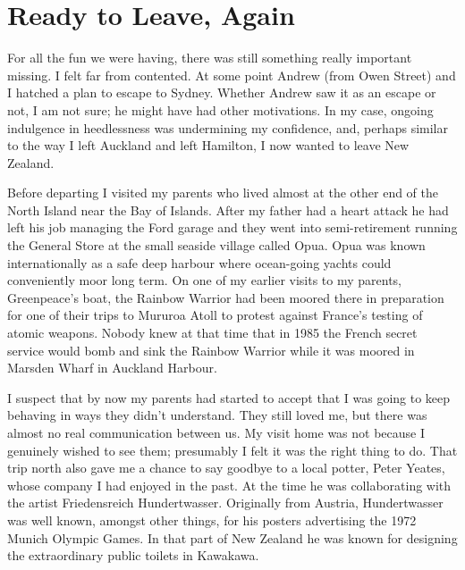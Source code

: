 \chapter{Ready to Leave, Again}

\enlargethispage{\baselineskip}

For all the fun we were having, there was still something really
important missing. I felt far from contented. At some point Andrew (from
Owen Street) and I hatched a plan to escape to Sydney. Whether Andrew
saw it as an escape or not, I am not sure; he might have had other
motivations. In my case, ongoing indulgence in heedlessness was
undermining my confidence, and, perhaps similar to the way I left
Auckland and left Hamilton, I now wanted to leave New Zealand.

Before departing I visited my parents who lived almost at the other end
of the North Island near the Bay of Islands. After my father had a heart
attack he had left his job managing the Ford garage and they went into
semi-retirement running the General Store at the small seaside village
called Opua. Opua was known internationally as a safe deep harbour where
ocean-going yachts could conveniently moor long term. On one of my
earlier visits to my parents, Greenpeace's boat, the \mbox{Rainbow} Warrior had been
moored there in preparation for one of their trips to Mururoa Atoll to
protest against France's testing of atomic weapons. Nobody knew at that
time that in 1985 the French secret service would bomb and sink the
Rainbow Warrior while it was moored in Marsden Wharf\cite{rainbow-warrior} in Auckland Harbour.

\enlargethispage{\baselineskip}

I suspect that by now my parents had started to accept that I was going
to keep behaving in ways they didn't understand. They still loved me,
but there was almost no real communication between us. My visit home was
not because I genuinely wished to see them; presumably I felt it was the
right thing to do. That trip north also gave me a chance to say goodbye
to a local potter, Peter Yeates, whose company I had enjoyed in the
past. At the time he was collaborating with the artist Friedensreich
Hundertwasser. Originally from Austria, Hundertwasser was well known,
amongst other things, for his posters advertising the
1972 Munich Olympic Games\cite{olympic}.
In that part of New Zealand he was known for designing the extraordinary
public toilets in Kawakawa\cite{toilets}.

